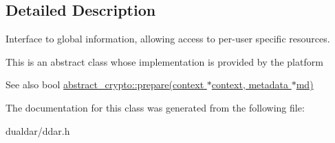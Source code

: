 \subsection{\-Detailed \-Description}
\-Interface to global information, allowing access to per-\/user specific resources. 

\-This is an abstract class whose implementation is provided by the platform

\begin{DoxySeeAlso}{\-See also}
bool \hyperlink{classddar_1_1abstract__crypto_a1f1a4d550c0840b4e04bc6d6129a0f13}{abstract\-\_\-crypto\-::prepare(context $\ast$context, metadata $\ast$md)} 
\end{DoxySeeAlso}


\-The documentation for this class was generated from the following file\-:\begin{DoxyCompactItemize}
\item 
dualdar/ddar.\-h\end{DoxyCompactItemize}
